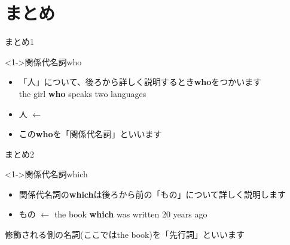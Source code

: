 \documentclass[aspectratio=169,xcolor={dvipsnames,table}]{beamer}
\begin{document}
\section{まとめ}
\begin{frame}[plain]{まとめ1}
 \begin{block}<1->{関係代名詞who }

\begin{itemize}[square]\small
 \item 「人」について、後ろから詳しく説明するとき\textbf{who}をつかいます\\
\hfill{\scriptsize the girl \textbf{who} speaks two languages}
 \item 人\,\,$\longleftarrow$\,\,
 \item この\textbf{who}を「関係代名詞」といいます
 \end{itemize}
     \end{block}


\end{frame}
\begin{frame}[plain]{まとめ2}
\begin{block}<1->{関係代名詞which }
 \begin{itemize}[square]
 \item 関係代名詞の\textbf{which}は後ろから前の「もの」について詳しく説明します%
 \item もの\,\,$\longleftarrow$\,\,\hfill{\scriptsize the book \textbf{which} was written 20 years ago}
 \end{itemize}


\hfill{\small 修飾される側の名詞{(\scriptsize ここではthe book)}を「先行詞」といいます}
     \end{block}

\end{frame}
\end{document}
